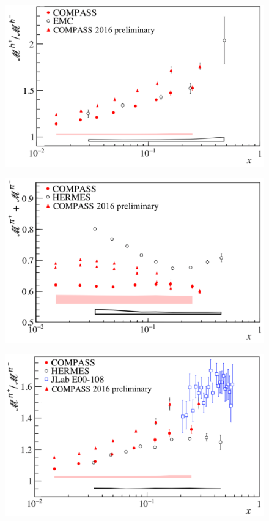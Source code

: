 \documentclass[letterpaper,12pt]{article}
\begin{document}
\begin{figure}[H]
	\includegraphics[scale=0.38]{./gfx/hr.png}
	\caption{}
	\label{hr}
\end{figure}

\begin{figure}[H]
	\includegraphics[scale=0.38]{./gfx/Pis.png}
	\caption{}
	\label{Pis}
\end{figure}

\begin{figure}[H]
	\includegraphics[scale=0.38]{./gfx/Pir.png}
	\caption{}
	\label{Pir}
\end{figure}
\end{document}
